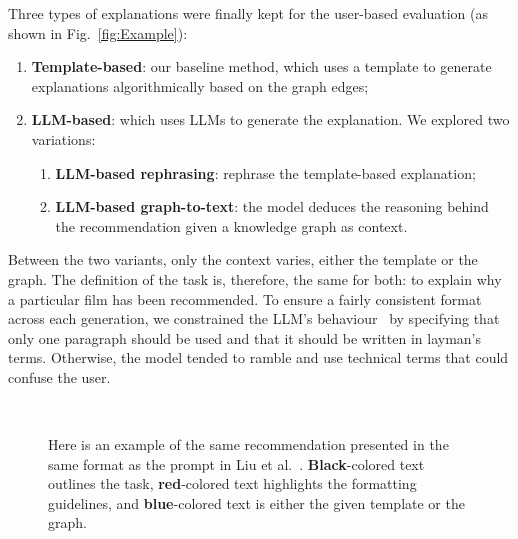 Three types of explanations were finally kept for the user-based evaluation (as shown in Fig.~\ref{fig:Example}):
\begin{enumerate}
    \item \textbf{Template-based}: our baseline method, which uses a template to generate explanations algorithmically based on the graph edges;
    \item \textbf{LLM-based}: which uses LLMs to generate the explanation. We explored two variations:
    \begin{enumerate}
    \item \textbf{LLM-based rephrasing}: rephrase the template-based explanation;
    \item \textbf{LLM-based graph-to-text}: the model deduces the reasoning behind the recommendation given a knowledge graph as context.
    \end{enumerate}
\end{enumerate}

Between the two variants, only the context varies, either the template or the graph. The definition of the task is, therefore, the same for both: to explain why a particular film has been recommended. To ensure a fairly consistent format across each generation, we constrained the LLM's behaviour~\cite{reynolds2021prompt} by specifying that only one paragraph should be used and that it should be written in layman's terms. Otherwise, the model tended to ramble and use technical terms that could confuse the user.

\begin{figure}[!ht]
    \centering
    \\

    \caption{
{Here is an example of the same recommendation presented in the same format as the prompt in Liu et al.~\cite{liu2023chatgpt}. \textbf{Black}-colored text outlines the task, \color{dark_red}\textbf{red}}-colored text highlights the formatting guidelines, and
{\color{indigo}\textbf{blue}}-colored text is either the given template or the graph.
}

\end{figure}
